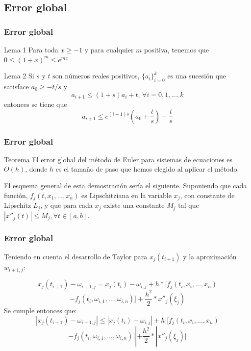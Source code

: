 \documentclass{beamer}
\begin{document}
\subsection{Error global}
\begin{frame}
	\frametitle{Error global}
	
	\begin{block}{Lema 1}
		Para toda $x \geq -1$ y para cualquier $m$ positiva, tenemos que $0 \leq (1 + x)^m \leq e^{mx}$
	\end{block}
	
	
	\begin{block}{Lema 2}
		Si $s$ y $t$ son números reales positivos, $\{a_i\}^k_{i=0}$ es una sucesión que satisface $ a_0 \geq -t/s$ y
		$$a_{i+1} \leq (1+s)a_i + t, \, \forall i=0, 1, ..., k$$
		entonces se tiene que
		$$a_{i+1} \leq e^{(i+1)s}\left( a_0 + \frac{t}{s}\right) - \frac{t}{s}$$
	\end{block}
	
	
	
\end{frame}

\begin{frame}
	\frametitle{Error global}
	\begin{block}{Teorema}
		El error global del método de Euler para sistemas de ecuaciones es $O(h)$, donde $h$ es el tamaño de paso que hemos elegido al aplicar el método. 
	\end{block}
	
	El esquema general de esta demostración sería el siguiente. Suponiendo que cada función, $f_j(t, x_1, ..., x_n)$ es Lipschitziana en la variable $x_j$, con constante de Lipschitz $L_j$, y que para cada $x_j$ existe una constante $M_j$ tal que $| x''_j(t) | \leq M_j, \forall t \in [a,b]$.\\
	
	
\end{frame}

\begin{frame}
	\frametitle{Error global}

	Teniendo en cuenta el desarrollo de Taylor para $x_j(t_{i+1})$ y la aproximación $w_{i+1,j}$:
	
	$$
	x_j(t_{i+1}) - \omega_{i+1,j} = x_j(t_i) - \omega_{i,j} + h*[f_j(t_i, x_i, ..., x_n) $$
	$$- f_j(t_i, \omega_{i,1}, ..., \omega_{i,n})] + \frac{h^2}{2}*x''_j(\xi_j) $$
	Se cumple entonces que:
	$$ | x_j(t_{i+1}) - \omega_{i+1,j} | \leq | x_j(t_i) - \omega_{i,j} | + h|[f_j(t_i, x_i, ..., x_n) $$
	$$- f_j(t_i, \omega_{i,1}, ..., \omega_{i,n})]| + \frac{h^2}{2}*|x''_j(\xi_j)| $$
	
	
	
\end{frame}
\end{document}
